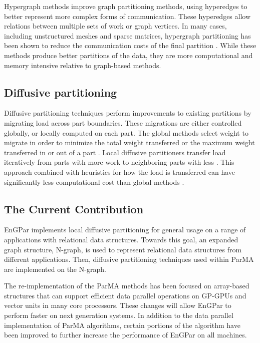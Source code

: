 Hypergraph methods improve graph partitioning methods, using
hyperedges to better represent more complex forms of
communication. These hyperedges allow relations
between multiple sets of work or graph vertices. In
many cases, including unstructured meshes and sparse matrices,
hypergraph partitioning has been shown to reduce the
communication costs of the final partition
\cite{catalyurek1999hypergraph,catalyurek2009repartitioning,devine2006parallel}.
While these methods produce better partitions of the data,
they are more computational and memory intensive relative
to graph-based methods.

\subsection{Diffusive partitioning}
Diffusive partitioning techniques perform improvements to existing
partitions by migrating load across part boundaries. These migrations
are either controlled globally, or locally computed on each part.
The global methods select weight to migrate in order to minimize
the total weight transferred or the maximum weight transferred
in or out of a part \cite{hu1999improved,ou1994parallel}. Local
diffusive partitioners transfer load iteratively from parts
with more work to neighboring parts with less
\cite{cybenko1989dynamic,subramanian1994analysis}. This approach
combined with heuristics for how the load is transferred can have
significantly less computational cost than global methods
\cite{Fiduccia1982,Kernighan1970}. 

\subsection{The Current Contribution}
EnGPar implements local diffusive partitioning for general
usage on a range of applications with relational data structures.
Towards this goal, an expanded graph structure, N-graph, is used to represent relational data structures from different applications. Then, diffusive partitioning techniques used within ParMA are implemented on the N-graph. 

The re-implementation of the ParMA methods has been focused
on array-based structures that can support efficient data
parallel operations on GP-GPUs and vector units in many core processors.
These changes will allow EnGPar to perform faster on next generation systems.
In addition to the data parallel implementation
of ParMA algorithms, certain portions of the algorithm have been improved to
further increase the performance of EnGPar on all machines. 

